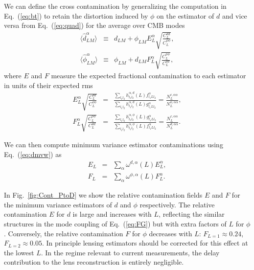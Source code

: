 \documentclass[prd,amsmath,amssymb,floatfix,superscriptaddress,nofootinbib,twocolumn]{revtex4-1}
\def\bea{\begin{eqnarray}}
\def\eea{\end{eqnarray}}
\newcommand{\ec}[1]{Eq.~(\ref{eq:#1})}
\newcommand{\rf}[1]{\ref{fig:#1}}
\begin{document}
 
 
 We can define the cross contamination by generalizing the computation in \ec{bt} to retain the distortion induced by $\phi$ on the estimator of $d$ and vice
 versa from \ec{quad} for the average over CMB modes
 \bea
 \langle \hat{d}^{\alpha}_{LM} \rangle &\equiv& d_{LM} +\phi_{LM}E_{L}^{\alpha}\sqrt{\frac{C_L^{dd}}{C_L^{\phi\phi}}}, \nonumber\\
 \langle \hat{\phi}^{\alpha}_{LM} \rangle &\equiv& \phi_{LM} +d_{LM}F_{L}^{\alpha}\sqrt{\frac{C_L^{\phi\phi}}{C_L^{dd}}},
\eea
where $E$ and $F$ measure the expected fractional contamination to each estimator in units of their expected rms
%
\bea
E^{\alpha}_{L}  \sqrt{\frac{C_{L}^{dd}}{C_{L}^{\phi\phi}}}  &=&\frac{\sum_{l_{1}l_{2}}h_{l_{1}l_{2}}^{\alpha,d}(L)f_{l_{1}Ll_{2}}^{\alpha}}{\sum_{l_{1}l_{2}}h_{l_{1}l_{2}}^{\alpha,d}(L)g_{l_{1}Ll_{2}}^{\alpha}} =\frac{N_{L}^{c,\alpha\alpha}}{N_{L}^{\phi,\alpha\alpha}},\nonumber\\
F^{\alpha}_{L} \sqrt{\frac{C_{L}^{\phi\phi}}{C_{L}^{dd}}}  &=&\frac{\sum_{l_{1}l_{2}}h_{l_{1}l_{2}}^{\alpha,\phi}(L)g_{l_{1}Ll_{2}}^{\alpha}}{\sum_{l_{1}l_{2}}h_{l_{1}l_{2}}^{\alpha,\phi}(L)f_{l_{1}Ll_{2}}^{\alpha}} =\frac{N_{L}^{c,\alpha\alpha}}{N_{L}^{d,\alpha\alpha}}.
\eea

 
We can then compute minimum variance estimator contaminations using \ec{dmvw} as
\bea
E_{L} &=&  
\sum_{\alpha}\omega^{d,\alpha}(L)  E^{\alpha}_{L} , \nonumber\\
F_{L} &=&\sum_{\alpha}\omega^{\phi,\alpha}(L) F^{\alpha}_{L} .
\eea

 
 In Fig.~\rf{Cont_PtoD} we show the relative contamination fields $E$ and $F$ for the minimum 
 variance estimators of $d$ and $\phi$ respectively.   The relative contamination $E$ for
 $d$ is large and increases with $L$, reflecting the similar structures in the
 mode coupling  of \ec{FG} but with extra factors of $L$ for $\phi$. 
 Conversely, the relative contamination $F$ for $\phi$ decreases with $L$: $F_{L=1} \approx 0.24$,  $F_{L=2} \approx 0.05$.  In principle lensing estimators 
 should be corrected for this effect at the lowest $L$. In the regime relevant to current 
 measurements, the delay contribution to the lens reconstruction is entirely negligible.
 
\end{document}
